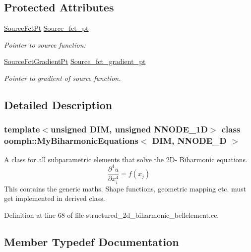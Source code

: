 \subsection*{Protected Attributes}
\begin{DoxyCompactItemize}
\item 
\hyperlink{classoomph_1_1MyBiharmonicEquations_a17bd58054c66229016eb1c52eab36bc1}{Source\+Fct\+Pt} \hyperlink{classoomph_1_1MyBiharmonicEquations_aa96fd779e04f5c726f2535f43210e905}{Source\+\_\+fct\+\_\+pt}
\begin{DoxyCompactList}\small\item\em Pointer to source function\+: \end{DoxyCompactList}\item 
\hyperlink{classoomph_1_1MyBiharmonicEquations_af007c03701e888fed7375cb4537f0046}{Source\+Fct\+Gradient\+Pt} \hyperlink{classoomph_1_1MyBiharmonicEquations_afbd71d4a6c31f36d88bf60697c4140aa}{Source\+\_\+fct\+\_\+gradient\+\_\+pt}
\begin{DoxyCompactList}\small\item\em Pointer to gradient of source function. \end{DoxyCompactList}\end{DoxyCompactItemize}


\subsection{Detailed Description}
\subsubsection*{template$<$unsigned D\+IM, unsigned N\+N\+O\+D\+E\+\_\+1D$>$\newline
class oomph\+::\+My\+Biharmonic\+Equations$<$ D\+I\+M, N\+N\+O\+D\+E\+\_\+D $>$}

A class for all subparametric elements that solve the 2\+D-\/ Biharmonic equations. \[ \frac{\partial^4 u}{\partial x_i^4} = f(x_j) \] This contains the generic maths. Shape functions, geometric mapping etc. must get implemented in derived class. 

Definition at line 68 of file structured\+\_\+2d\+\_\+biharmonic\+\_\+bellelement.\+cc.



\subsection{Member Typedef Documentation}
\mbox{\label{classoomph_1_1MyBiharmonicEquations_af007c03701e888fed7375cb4537f0046}} 
